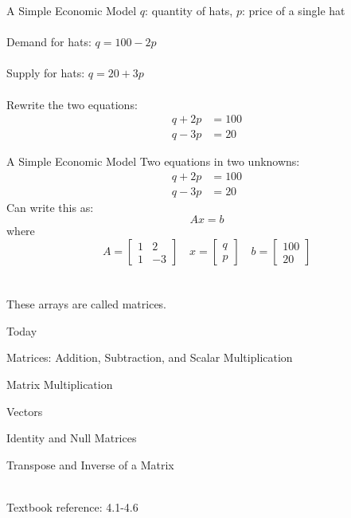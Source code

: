 \documentclass{./../../Latex/teaching_slides}
\begin{document}
\begin{frame}{A Simple Economic Model}
$ q $: quantity of hats, $p$: price of a single hat \\~\\
Demand for hats: $ q = 100-2p $ \\~\\
Supply for hats: $ q = 20+3p $ \\~\\
Rewrite the two equations: 
\begin{align*}
q + 2p &= 100 \\ q-3p &= 20
\end{align*}
\end{frame}

\begin{frame}{A Simple Economic Model}
Two equations in two unknowns:
\begin{align*}
q + 2p &= 100 \\ q-3p &= 20
\end{align*}
Can write this as:
$$ Ax = b $$
where
$$A = \begin{bmatrix}
1 & 2 \\
1 & -3 
\end{bmatrix} \quad 
x = \begin{bmatrix}
q \\
p 
\end{bmatrix} \quad 
b = \begin{bmatrix}
100 \\
20 
\end{bmatrix}$$ \\~\\
These arrays are called matrices. 
\end{frame}


\begin{frame}{Today}
\begin{witemize}
\item Matrices: Addition, Subtraction, and Scalar Multiplication
\item Matrix Multiplication
\item Vectors
\item Identity and Null Matrices 
\item Transpose and Inverse of a Matrix \\~\\
\end{witemize}
Textbook reference: 4.1-4.6
\end{frame}
\end{document}
